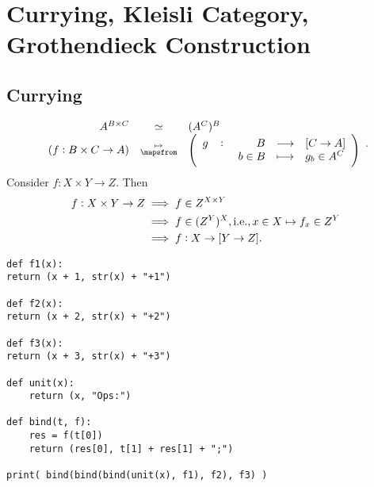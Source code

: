 \section{Currying, Kleisli Category, Grothendieck Construction}
\subsection{Currying}
\begin{note}
\[
\begin{array}{rcl}
	A^{B\times C}&\simeq &(A^C)^B \\
	(f:B\times C\to A)&\substack{\mapsto\\ \mapsfrom} &\left(\fullfunction{g}{B}{[C\to A]}{b\in B}{g_b\in A^C}\right)
\end{array}.
\] Consider $f:X\times Y\to Z$. Then\begin{align*}
	f:X\times Y\to Z&\implies f\in Z^{X\times Y} \\
	&\implies f\in (Z^{Y})^X, \textnormal{i.e.}, x\in X\mapsto f_x\in Z^Y \\
	&\implies f:X\to[Y\to Z].
\end{align*}
\end{note}

\begin{lstlisting}
def f1(x):
return (x + 1, str(x) + "+1")

def f2(x):
return (x + 2, str(x) + "+2")

def f3(x):
return (x + 3, str(x) + "+3")

def unit(x):
	return (x, "Ops:")
	
def bind(t, f):
	res = f(t[0])
	return (res[0], t[1] + res[1] + ";")
	
print( bind(bind(bind(unit(x), f1), f2), f3) )
\end{lstlisting}